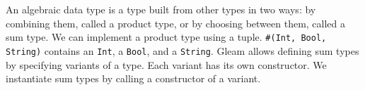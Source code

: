 \begin{blocksection}
An algebraic data type is a type built from other types in two ways: by combining them, called a product type, or by choosing between them, called a sum type.
We can implement a product type using a tuple. \lstinline{#(Int, Bool, String)} contains an \lstinline{Int}, a \lstinline{Bool}, and a \lstinline{String}.
Gleam allows defining sum types by specifying variants of a type. Each variant has its own constructor. We instantiate sum types by calling a constructor of a variant.
\end{blocksection}